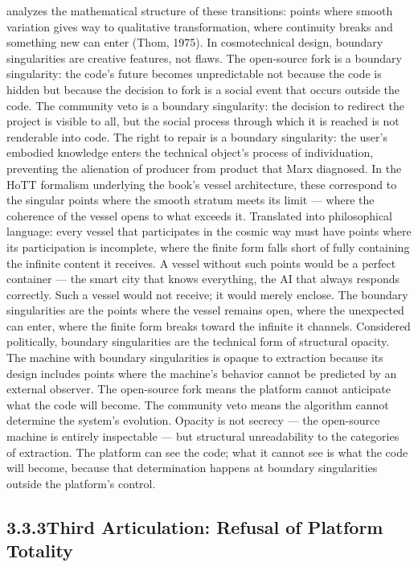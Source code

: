 analyzes the mathematical structure of these transitions: points where smooth variation gives way to qualitative transformation, where continuity breaks and something new can enter (Thom, 1975). In cosmotechnical design, boundary singularities are creative features, not flaws. The open-source fork is a boundary singularity: the code’s future becomes unpredictable not because the code is hidden but because the decision to fork is a social event that occurs outside the code. The community veto is a boundary singularity: the decision to redirect the project is visible to all, but the social process through which it is reached is not renderable into code. The right to repair is a boundary singularity: the user’s embodied knowledge enters the technical object’s process of individuation, preventing the alienation of producer from product that Marx diagnosed. In the HoTT formalism underlying the book’s vessel architecture, these correspond to the singular points where the smooth stratum meets its limit — where the coherence of the vessel opens to what exceeds it. Translated into philosophical language: every vessel that participates in the cosmic way must have points where its participation is incomplete, where the finite form falls short of fully containing the infinite content it receives. A vessel without such points would be a perfect container — the smart city that knows everything, the AI that always responds correctly. Such a vessel would not receive; it would merely enclose. The boundary singularities are the points where the vessel remains open, where the unexpected can enter, where the finite form breaks toward the infinite it channels. Considered politically, boundary singularities are the technical form of structural opacity. The machine with boundary singularities is opaque to extraction because its design includes points where the machine’s behavior cannot be predicted by an external observer. The open-source fork means the platform cannot anticipate what the code will become. The community veto means the algorithm cannot determine the system’s evolution. Opacity is not secrecy — the open-source machine is entirely inspectable — but structural unreadability to the categories of extraction. The platform can see the code; what it cannot see is what the code will become, because that determination happens at boundary singularities outside the platform’s control.

\subsection{3.3.3\quad Third Articulation: Refusal of Platform Totality}

